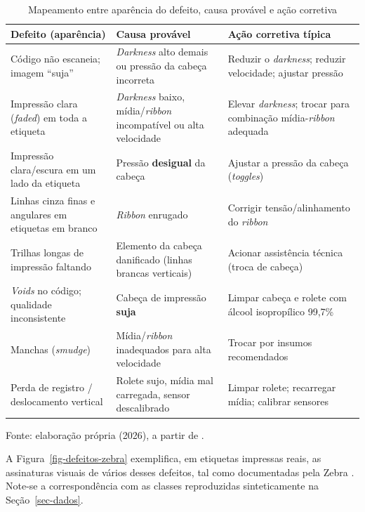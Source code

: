 \documentclass[
	article,			%
	11pt,				%
	oneside,			%
	a4paper,			%
	english,			%
	brazilian,			%
	sumario=tradicional
	]{abntex2}
\begin{document}
\begin{table}[htb]
\centering
\caption{Mapeamento entre aparência do defeito, causa provável e ação corretiva}
\label{tab-defeitos}
\begin{tabular}{@{}p{4.4cm}p{4.2cm}p{4.6cm}@{}}
\toprule
\textbf{Defeito (aparência)} & \textbf{Causa provável} & \textbf{Ação corretiva típica}\\
\midrule
Código não escaneia; imagem ``suja'' & \textit{Darkness} alto demais ou pressão da
cabeça incorreta & Reduzir o \textit{darkness}; reduzir velocidade; ajustar pressão\\
Impressão clara (\textit{faded}) em toda a etiqueta & \textit{Darkness} baixo,
mídia/\textit{ribbon} incompatível ou alta velocidade & Elevar \textit{darkness};
trocar para combinação mídia-\textit{ribbon} adequada\\
Impressão clara/escura em um lado da etiqueta & Pressão \textbf{desigual} da cabeça
& Ajustar a pressão da cabeça (\textit{toggles})\\
Linhas cinza finas e angulares em etiquetas em branco & \textit{Ribbon} enrugado &
Corrigir tensão/alinhamento do \textit{ribbon}\\
Trilhas longas de impressão faltando & Elemento da cabeça danificado (linhas
brancas verticais) & Acionar assistência técnica (troca de cabeça)\\
\textit{Voids} no código; qualidade inconsistente & Cabeça de impressão \textbf{suja}
& Limpar cabeça e rolete com álcool isopropílico 99,7\%\\
Manchas (\textit{smudge}) & Mídia/\textit{ribbon} inadequados para alta velocidade
& Trocar por insumos recomendados\\
Perda de registro / deslocamento vertical & Rolete sujo, mídia mal carregada,
sensor descalibrado & Limpar rolete; recarregar mídia; calibrar sensores\\
\bottomrule
\end{tabular}

\vspace{2pt}
{\footnotesize Fonte: elaboração própria (2026), a partir de .}
\end{table}

A Figura~\ref{fig-defeitos-zebra} exemplifica, em etiquetas impressas reais, as
assinaturas visuais de vários desses defeitos, tal como documentadas pela Zebra
\cite{zebra_kb_printquality}. Note-se a correspondência com as classes reproduzidas
sinteticamente na Seção~\ref{sec-dados}.
\end{document}
